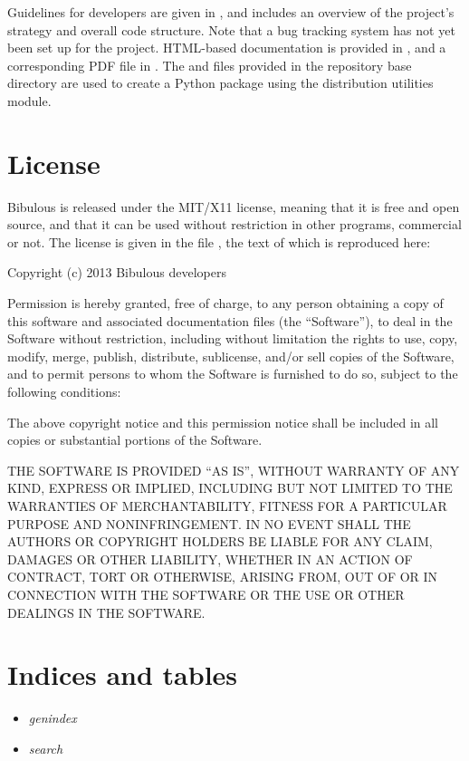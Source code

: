 \documentclass[letterpaper,10pt,english]{sphinxmanual}
\begin{document}
Guidelines for developers are given in , and includes an overview of the project's strategy and overall code structure. Note that a bug tracking system has not yet been set up for the project. HTML-based documentation is provided in , and a corresponding PDF file in . The  and  files provided in the repository base directory are used to create a Python package using the  distribution utilities module.


\section{License}
\label{index:license}
Bibulous is released under the MIT/X11 license, meaning that it is free and open source, and that it can be used without restriction in other programs, commercial or not. The license is given in the file , the text of which is reproduced here:

Copyright (c) 2013 Bibulous developers

Permission is hereby granted, free of charge, to any person obtaining a copy of this software and
associated documentation files (the ``Software''), to deal in the Software without restriction,
including without limitation the rights to use, copy, modify, merge, publish, distribute,
sublicense, and/or sell copies of the Software, and to permit persons to whom the Software is
furnished to do so, subject to the following conditions:

The above copyright notice and this permission notice shall be included in all copies or
substantial portions of the Software.

THE SOFTWARE IS PROVIDED ``AS IS'', WITHOUT WARRANTY OF ANY KIND, EXPRESS OR IMPLIED, INCLUDING BUT
NOT LIMITED TO THE WARRANTIES OF MERCHANTABILITY, FITNESS FOR A PARTICULAR PURPOSE AND
NONINFRINGEMENT. IN NO EVENT SHALL THE AUTHORS OR COPYRIGHT HOLDERS BE LIABLE FOR ANY CLAIM,
DAMAGES OR OTHER LIABILITY, WHETHER IN AN ACTION OF CONTRACT, TORT OR OTHERWISE, ARISING FROM, OUT
OF OR IN CONNECTION WITH THE SOFTWARE OR THE USE OR OTHER DEALINGS IN THE SOFTWARE.


\section{Indices and tables}
\label{index:indices-and-tables}\begin{itemize}
\item {} 
\emph{genindex}

\item {} 
\emph{search}

\end{itemize}
\end{document}
